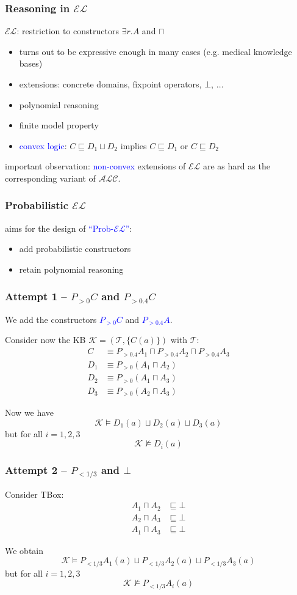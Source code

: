 \documentclass[draft]{beamer}
\newcommand{\el}{\ensuremath{\mathcal{EL}}\xspace}
\newcommand{\alc}{\ensuremath{\mathcal{ALC}}\xspace}
\newcommand{\exptime}{\ensuremath{\textsc{ExpTime}}\xspace}
\renewcommand{\emph}[1]{\textcolor{blue}{#1}}
\begin{document}
\begin{frame}
  \frametitle{Reasoning in \el}
  \el: restriction to constructors $\exists r.A$ and $\sqcap$
  \begin{itemize}
    \item turns out to be expressive enough in many cases (\mbox{e.g.} medical knowledge bases)
    \item extensions: concrete domains, fixpoint operators, $\bot$, $\dots$
    \item polynomial reasoning
    \item finite model property 
    \item \emph{convex logic}: $C\sqsubseteq D_1\sqcup D_2$ implies $C\sqsubseteq D_1$ or $C\sqsubseteq D_2$
  \end{itemize}
  important observation: \emph{non-convex} extensions of \el are as hard as the corresponding variant of \alc.
\end{frame}


\begin{frame}
  \frametitle{Probabilistic \el}
  aims for the design of \emph{``Prob-\el''}:
  \begin{itemize}
    \item add probabilistic constructors
    \item retain polynomial reasoning
  \end{itemize}

\end{frame}

\begin{frame}
  \frametitle{Attempt 1 -- $P_{>0}C$ and $P_{>0.4}C$}
  We add the constructors \emph{$P_{>0}C$} and \emph{$P_{>0.4}A$}. 

  Consider now the KB $\mathcal K=(\mathcal T, \{C(a)\})$ with $\mathcal T$: 
  \begin{align*}
    C &\equiv P_{>0.4}A_1\sqcap P_{>0.4}A_2\sqcap P_{>0.4}A_3 \\
    D_1 &\equiv P_{>0}(A_1\sqcap A_2) \\
    D_2 &\equiv P_{>0}(A_1\sqcap A_3) \\
    D_3 &\equiv P_{>0}(A_2\sqcap A_3)
  \end{align*}

  \pause
  Now we have $$\mathcal K\models D_1(a)\sqcup D_2(a)\sqcup D_3(a)$$ but for all $i=1,2,3$ $$\mathcal K\not\models D_i(a)$$
\end{frame}


\begin{frame}
  \frametitle{Attempt 2 -- $P_{<1/3}$ and $\bot$}

  Consider TBox: 
  \begin{align*}
    A_1\sqcap A_2 &\sqsubseteq\bot \\
    A_2\sqcap A_3 &\sqsubseteq\bot \\
    A_1\sqcap A_3 &\sqsubseteq\bot
  \end{align*}

  \pause
  We obtain 
  $$\mathcal K\models P_{<1/3}A_1(a)\sqcup P_{<1/3}A_2(a)\sqcup P_{<1/3}A_3(a)$$ but for all $i=1,2,3$ 
  $$\mathcal K\not\models P_{<1/3}A_i(a)$$
\end{frame}
\end{document}
